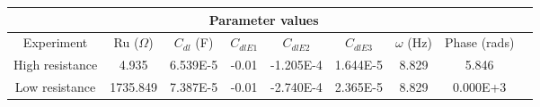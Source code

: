 \documentclass[preview]{standalone}
\begin{document}
\begin{center}
\begin{tabular}{|c|c|c|c|c|c|c|c|c|}
\hline
\multicolumn{8}{|c|}{Parameter values}\\ 
\hline
Experiment & Ru ($\Omega$) & $C_{dl}$ (F) & $C_{dlE1}$ & $C_{dlE2}$ & $C_{dlE3}$ & $\omega$ (Hz) & Phase (rads)\\
\hline
High resistance & 4.935 & 6.539E-5 & -0.01 & -1.205E-4 & 1.644E-5 & 8.829 & 5.846\\
\hline
Low resistance & 1735.849 & 7.387E-5 & -0.01 & -2.740E-4 & 2.365E-5 & 8.829 & 0.000E+3\\
\hline
\end{tabular}
\end{center}
\end{document}
